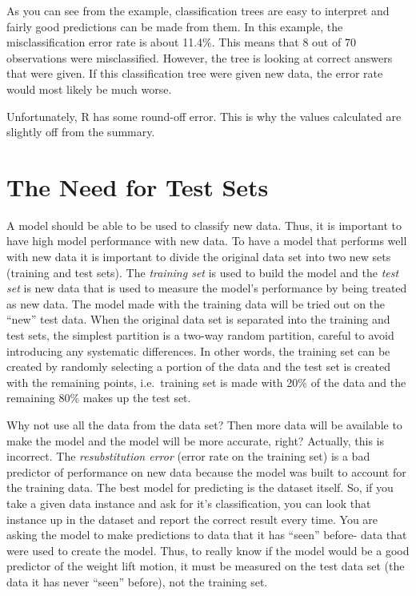 \documentclass[12pt,twoside]{reedthesis}
\begin{document}
  As you can see from the example, classification trees are easy to
  interpret and fairly good predictions can be made from them. In this
  example, the misclassification error rate is about 11.4\%. This means
  that 8 out of 70 observations were misclassified. However, the tree is
  looking at correct answers that were given. If this classification tree
  were given new data, the error rate would most likely be much worse.
  
  Unfortunately, R has some round-off error. This is why the values
  calculated are slightly off from the summary.
  
  \section{The Need for Test Sets}\label{the-need-for-test-sets}
  
  A model should be able to be used to classify new data. Thus, it is
  important to have high model performance with new data. To have a model
  that performs well with new data it is important to divide the original
  data set into two new sets (training and test sets). The \emph{training
  set} is used to build the model and the \emph{test set} is new data that
  is used to measure the model's performance by being treated as new data.
  The model made with the training data will be tried out on the ``new''
  test data. When the original data set is separated into the training and
  test sets, the simplest partition is a two-way random partition, careful
  to avoid introducing any systematic differences. In other words, the
  training set can be created by randomly selecting a portion of the data
  and the test set is created with the remaining points, i.e.~training set
  is made with 20\% of the data and the remaining 80\% makes up the test
  set.
  
  Why not use all the data from the data set? Then more data will be
  available to make the model and the model will be more accurate, right?
  Actually, this is incorrect. The \emph{resubstitution error} (error rate
  on the training set) is a bad predictor of performance on new data
  because the model was built to account for the training data. The best
  model for predicting is the dataset itself. So, if you take a given data
  instance and ask for it's classification, you can look that instance up
  in the dataset and report the correct result every time. You are asking
  the model to make predictions to data that it has ``seen'' before- data
  that were used to create the model. Thus, to really know if the model
  would be a good predictor of the weight lift motion, it must be measured
  on the test data set (the data it has never ``seen'' before), not the
  training set.
  
\end{document}
